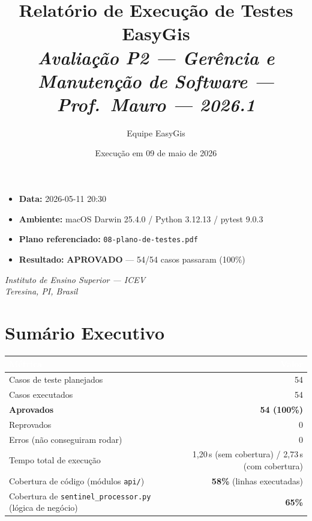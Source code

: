 \documentclass[11pt, a4paper]{article}
\title{%
  \vspace{-1.5cm}
  {\Huge\bfseries\color{accentdim} Relatório de Execução de Testes}\\[8pt]
  {\Large\bfseries EasyGis}\\[18pt]
  {\normalsize\itshape Avaliação P2 --- Gerência e Manutenção de Software --- Prof.\ Mauro --- 2026.1}
}
\author{Equipe EasyGis}
\date{Execução em 09 de maio de 2026}
\begin{document}
\maketitle
\thispagestyle{empty}

\begin{infobox}[title={Resumo da execução}]
\begin{itemize}
  \item \textbf{Data:} 2026-05-11 20:30
  \item \textbf{Ambiente:} macOS Darwin 25.4.0 / Python 3.12.13 / pytest 9.0.3
  \item \textbf{Plano referenciado:} \texttt{08-plano-de-testes.pdf}
  \item \textbf{Resultado:} \textbf{\color{successgreen}APROVADO} --- 54/54 casos passaram (100\%)
\end{itemize}
\end{infobox}

\vfill
\begin{center}
\small\textit{Instituto de Ensino Superior --- ICEV}\\
\small\textit{Teresina, PI, Brasil}
\end{center}
\newpage

\tableofcontents
\newpage

\section{Sumário Executivo}

\renewcommand{\arraystretch}{1.4}
\begin{table}[H]
\centering
\small
{}
\begin{tabularx}{\textwidth}{@{}Xr@{}}
\toprule
\rowcolor{tabheader}\textcolor{white}{\textbf{Métrica}} & \textcolor{white}{\textbf{Valor}}\\
\midrule
Casos de teste planejados & 54\\
Casos executados & 54\\
\textbf{Aprovados} & \textbf{\color{successgreen}54 (100\%)}\\
Reprovados & 0\\
Erros (não conseguiram rodar) & 0\\
Tempo total de execução & 1,20\,s (sem cobertura) / 2,73\,s (com cobertura)\\
Cobertura de código (módulos \texttt{api/}) & \textbf{58\%} (linhas executadas)\\
Cobertura de \texttt{sentinel\_processor.py} (lógica de negócio) & \textbf{65\%}\\
\bottomrule
\end{tabularx}
\end{table}
\end{document}
